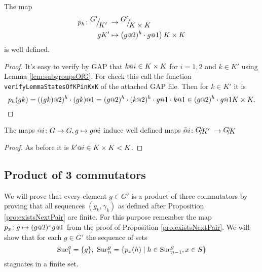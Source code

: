 \documentclass[a4paper,12pt]{article}
\begin{document}
\begin{lem} \label{lem:pIsDefinedModK'}
 The map 
 \begin{align*} 
  \bar p_h\colon \RNK{G'}{K'} &\to \RNK{G'}{K\times K}\\
  gK'&\mapsto \left(g\at{2})^h\cdot g\at{1}\right){K\times K}
 \end{align*}
is well defined.
\end{lem}
\begin{proof}
 It's easy to verify by GAP that $k\at{i} \in K\times K$ for $i=1,2$ and $k\in K'$ using Lemma \ref{lem:subgroupsOfG}.
 For check this call the function \lstinline{verifyLemmaStatesOfKPinKxK} of the attached GAP file.
 Then for $k\in K'$ it is 
 \[p_h(gk) = ((gk)\at{2})^h\cdot (gk)\at{1} = (g\at{2})^h\cdot (k\at{2})^h\cdot g\at{1}\cdot k\at{1}\in (g\at{2})^h\cdot g\at{1}K\times K.\]
\end{proof}
\begin{lem} \label{lem:atIsWellDefinedModK'}
 The maps $\at{i}\colon G\to G, g\mapsto g\at{i}$ induce well defined maps $\att{i}\colon \RNK{G}{K'}\to\RNK{G}{K}$
\end{lem}
\begin{proof}
 As before it is $k'\at{i} \in K\times K < K$.
%  
%  
% 
\end{proof}
\subsection{Product of 3 commutators}
We will prove that every element $g\in G'$ is a product of three commutators by proving that all
sequences $(g_k,\gamma_k)$ as defined after Proposition \ref{pro:existsNextPair} are finite.
For this purpose remember the map $p_x\colon g \mapsto (g\at{2})^x g\at{1}$ from the proof of Proposition \ref{pro:existsNextPair}.
We will show that for each $g\in G'$ the sequence of sets 
\[\textup{Suc}_1^g=\{g\},\ \textup{Suc}_n^g = \{p_x(h) \mid h\in \textup{Suc}_{n-1}^g, x\in S\} \]
stagnates in a finite set. 
\end{document}
